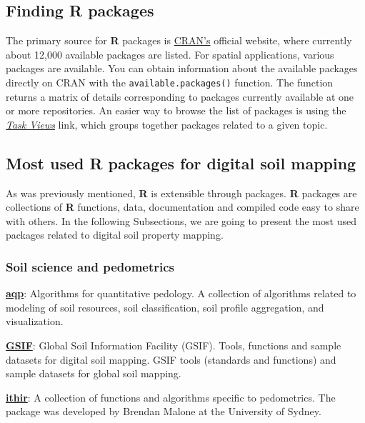 \documentclass[10pt,b5paper,]{book}
\theoremstyle{definition}
\theoremstyle{definition}
\theoremstyle{definition}
\theoremstyle{remark}
\begin{document}
\hypertarget{finding-r-packages}{%
\subsection{Finding R packages}\label{finding-r-packages}}

The primary source for \textbf{R} packages is
\href{https://cran.r-project.org/}{CRAN's} official website, where
currently about 12,000 available packages are listed. For spatial
applications, various packages are available. You can obtain information
about the available packages directly on CRAN with the
\texttt{available.packages()} function. The function returns a matrix of
details corresponding to packages currently available at one or more
repositories. An easier way to browse the list of packages is using the
\href{https://cran.r-project.org/web/views/}{\emph{Task Views}} link,
which groups together packages related to a given topic.

\hypertarget{most-used-r-packages-for-digital-soil-mapping}{%
\subsection{Most used R packages for digital soil
mapping}\label{most-used-r-packages-for-digital-soil-mapping}}

As was previously mentioned, \textbf{R} is extensible through packages.
\textbf{R} packages are collections of \textbf{R} functions, data,
documentation and compiled code easy to share with others. In the
following Subsections, we are going to present the most used packages
related to digital soil property mapping.

\hypertarget{SoilPedometrics}{%
\subsubsection{Soil science and pedometrics}\label{SoilPedometrics}}

\href{https://CRAN.R-project.org/package=aqp}{\textbf{aqp}}: Algorithms
for quantitative pedology. A collection of algorithms related to
modeling of soil resources, soil classification, soil profile
aggregation, and visualization.

\href{https://CRAN.R-project.org/package=GSIF}{\textbf{GSIF}}: Global
Soil Information Facility (GSIF). Tools, functions and sample datasets
for digital soil mapping. GSIF tools (standards and functions) and
sample datasets for global soil mapping.

\href{http://ithir.r-forge.r-project.org/}{\textbf{ithir}}: A collection
of functions and algorithms specific to pedometrics. The package was
developed by Brendan Malone at the University of Sydney.
\end{document}
